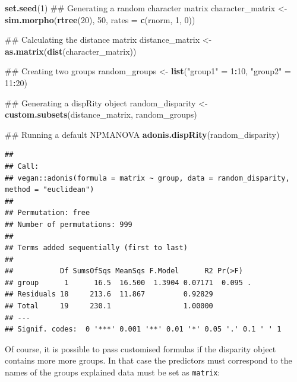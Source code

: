 \documentclass[]{book}
\newenvironment{Shaded}{\begin{snugshade}}{\end{snugshade}}
\newcommand{\KeywordTok}[1]{\textcolor[rgb]{0.13,0.29,0.53}{\textbf{#1}}}
\newcommand{\DataTypeTok}[1]{\textcolor[rgb]{0.13,0.29,0.53}{#1}}
\newcommand{\DecValTok}[1]{\textcolor[rgb]{0.00,0.00,0.81}{#1}}
\newcommand{\StringTok}[1]{\textcolor[rgb]{0.31,0.60,0.02}{#1}}
\newcommand{\OperatorTok}[1]{\textcolor[rgb]{0.81,0.36,0.00}{\textbf{#1}}}
\newcommand{\NormalTok}[1]{#1}
\theoremstyle{definition}
\theoremstyle{definition}
\theoremstyle{remark}
\begin{document}
\begin{Shaded}
\begin{Highlighting}[]
\KeywordTok{set.seed}\NormalTok{(}\DecValTok{1}\NormalTok{)}
\NormalTok{## Generating a random character matrix}
\NormalTok{character_matrix <-}\StringTok{ }\KeywordTok{sim.morpho}\NormalTok{(}\KeywordTok{rtree}\NormalTok{(}\DecValTok{20}\NormalTok{), }\DecValTok{50}\NormalTok{, }\DataTypeTok{rates =} \KeywordTok{c}\NormalTok{(rnorm, }\DecValTok{1}\NormalTok{, }\DecValTok{0}\NormalTok{))}

\NormalTok{## Calculating the distance matrix}
\NormalTok{distance_matrix <-}\StringTok{ }\KeywordTok{as.matrix}\NormalTok{(}\KeywordTok{dist}\NormalTok{(character_matrix))}

\NormalTok{## Creating two groups}
\NormalTok{random_groups <-}\StringTok{ }\KeywordTok{list}\NormalTok{(}\StringTok{"group1"}\NormalTok{ =}\StringTok{ }\DecValTok{1}\OperatorTok{:}\DecValTok{10}\NormalTok{, }\StringTok{"group2"}\NormalTok{ =}\StringTok{ }\DecValTok{11}\OperatorTok{:}\DecValTok{20}\NormalTok{)}

\NormalTok{## Generating a dispRity object}
\NormalTok{random_disparity <-}\StringTok{ }\KeywordTok{custom.subsets}\NormalTok{(distance_matrix, random_groups)}

\NormalTok{## Running a default NPMANOVA}
\KeywordTok{adonis.dispRity}\NormalTok{(random_disparity)}
\end{Highlighting}
\end{Shaded}

\begin{verbatim}
## 
## Call:
## vegan::adonis(formula = matrix ~ group, data = random_disparity,      method = "euclidean") 
## 
## Permutation: free
## Number of permutations: 999
## 
## Terms added sequentially (first to last)
## 
##           Df SumsOfSqs MeanSqs F.Model      R2 Pr(>F)  
## group      1      16.5  16.500  1.3904 0.07171  0.095 .
## Residuals 18     213.6  11.867         0.92829         
## Total     19     230.1                 1.00000         
## ---
## Signif. codes:  0 '***' 0.001 '**' 0.01 '*' 0.05 '.' 0.1 ' ' 1
\end{verbatim}

Of course, it is possible to pass customised formulas if the disparity
object contains more more groups. In that case the predictors must
correspond to the names of the groups explained data must be set as
\texttt{matrix}:
\end{document}
